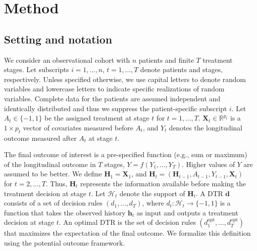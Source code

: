 \documentclass[12pt]{article}
\begin{document}
\section{Method}

\subsection{Setting and notation}

We consider an observational cohort with $n$ patients and finite $T$ treatment stages. Let subscripts $i=1,\ldots,n$, $t=1,\ldots,T$ denote patients and stages, respectively. Unless specified otherwise, we use capital letters to denote random variables and lowercase letters to indicate specific realizations of random variables.  Complete data for the patients are assumed independent and identically distributed and thus we suppress the patient-specific subscript $i$. Let $A_t\in \{-1, 1\}$ be the assigned treatment at stage $t$ for $t = 1, \ldots, T$.   $\bm{X}_t \in \mathbb{R}^{p_t}$ is a  $1 \times p_t$ vector of covariates measured before $A_t$, and $Y_t$ denotes the longitudinal %
outcome measured after $A_t$ at stage $t$. 

The final outcome of interest is a pre-specified function (e.g., sum or maximum) of the longitudinal outcome in $T$ stages, $Y = f(Y_1,\ldots, Y_T)$. Higher values of $Y$ are assumed to be better. We define $\bm{H}_1=\bm{X}_1$, and $\bm{H}_t=\left(\bm{H}_{t-1}, A_{t-1}, Y_{t-1}, \bm{X}_t\right)$ for $t=2, \ldots, T$. Thus, $\bm{H}_t$ represents the information available before making the treatment decision at stage $t$. Let $\mathcal{H}_t$ denote the support of $\bm{H}_t$. A DTR $\bm{d}$ consists of a set of decision rules $(d_1, \ldots, d_T)$, where $d_t: \mathcal{H}_t \to \{-1, 1\}$ is a function that takes the observed history $\bm{h}_t$ as input and outputs a treatment decision at stage $t$. An optimal DTR is the set of decision rules $\left(d^{\mathrm{opt}}_1, \ldots, d^{\mathrm{opt}}_T\right)$ that maximizes the expectation of the final outcome. We formalize this definition using the potential outcome framework.
\end{document}
